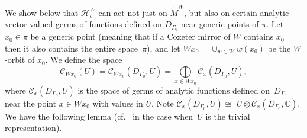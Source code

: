 \documentclass[12pt]{amsart}
\newcommand{\C}{\mathbb C}
\newcommand{\cH}{\mathcal{H}}
\DeclareMathOperator{\id}{id}
\DeclareMathOperator{\diag}{diag}
\numberwithin{equation}{section}
\theoremstyle{definition}
\newtheorem{remark}[theorem]{Remark}
\begin{document}


We show below that $\cH_c^W$ can act not just on $\widetilde{M}^W$, but also on certain analytic vector-valued germs of functions defined on $D_{\Gamma_0}$ near generic points of $\pi$. 
Let $x_0 \in \pi$ be a generic point (meaning that if a Coxeter mirror of $W$ contains $x_0$ then it also contains the entire space~$\pi$), and let $Wx_0 = \cup_{w \in W} w(x_0)$ be the $W$-orbit of $x_0$. We define the space 
\[\mathcal{C}_{Wx_0}(U) = \mathcal{C}_{Wx_0}(D_{\Gamma_0}, U) = \bigoplus\limits_{x \in Wx_0} \mathcal{C}_{x}(D_{\Gamma_0}, U),\]
where $ \mathcal{C}_{x}(D_{\Gamma_0}, U)$ is
the space of germs of analytic functions defined on~$D_{\Gamma_0}$ near the point $x \in Wx_0$ 
with values in $U$. Note $\mathcal{C}_{x}(D_{\Gamma_0}, U) \cong$ $U \otimes \mathcal{C}_{x}(D_{\Gamma_0}, \C)$.
We have the following lemma (cf.\ \cite{Feigin} in the case when~$U$ is the trivial representation).
\end{document}
